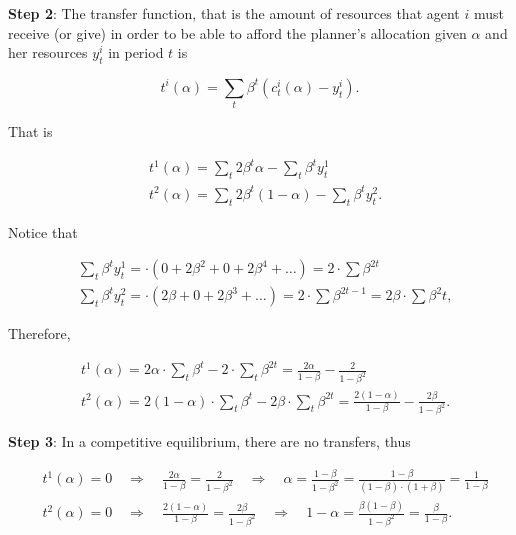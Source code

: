 \documentclass[12pt,a4paper]{article}
\begin{document}
\begin{itemize}
    \textbf{Step 2}: The transfer function, that is the amount of resources that agent $i$ must receive (or give) in order to be able to afford the planner's allocation given $\alpha$ and her resources $y^i_t$ in period $t$ is

      $$
      t^i(\alpha) = \sum_{t} \beta^t \left( c_t^i(\alpha)- y_t^i \right).
      $$

    That is

    \begin{align*}
      & t^1(\alpha) = \sum_{t} 2 \beta^t \alpha - \sum_{t} \beta^t  y_t^1 \\
      & t^2(\alpha) = \sum_{t} 2 \beta^t (1 - \alpha) - \sum_{t} \beta^t y_t^2.
    \end{align*}

    Notice that

    \begin{align*}
      & \sum_{t} \beta^t  y_t^1 = \cdot (0 + 2\beta^2 + 0 + 2\beta^4 + \ldots) = 2 \cdot \sum \beta^{2t}  \\
      & \sum_{t} \beta^t  y_t^2 = \cdot (2\beta + 0 + 2\beta^3 + \ldots) = 2 \cdot \sum \beta^{2t - 1} = 2 \beta \cdot \sum \beta^2t,
    \end{align*}

Therefore,

  \begin{align*}
    & t^1(\alpha) = 2\alpha \cdot \sum_{t} \beta^t - 2 \cdot \sum_{t} \beta^{2t} =  \frac{2\alpha}{1 - \beta} - \frac{2}{1 - \beta^2}\\
    & t^2(\alpha) = 2(1 - \alpha) \cdot \sum_{t} \beta^t - 2\beta \cdot \sum_{t} \beta^{2t} = \frac{2 (1 - \alpha)}{1 - \beta} - \frac{2 \beta}{1 - \beta^2}.
  \end{align*}

  \textbf{Step 3}: In a competitive equilibrium, there are no transfers, thus

  \begin{align*}
    & t^1(\alpha) = 0 \quad \Rightarrow \quad \frac{2\alpha}{1 - \beta} = \frac{2}{1 - \beta^2} \quad \Rightarrow \quad \alpha = \frac{1 - \beta}{1 - \beta^2} = \frac{1 - \beta}{(1 - \beta)\cdot(1 + \beta)} = \frac{1}{1 - \beta}  \\
    & t^2(\alpha) = 0 \quad \Rightarrow \quad \frac{2 (1 - \alpha)}{1 - \beta} = \frac{2 \beta}{1 - \beta^2}  \quad \Rightarrow \quad 1 - \alpha = \frac{\beta(1 - \beta)}{1 - \beta^2} = \frac{\beta}{1 - \beta}.
  \end{align*}


\end{itemize}
\end{document}
